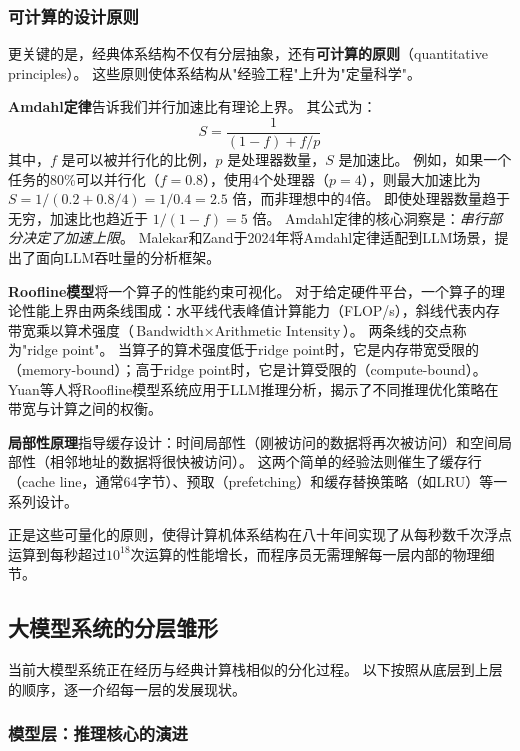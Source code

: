 \subsubsection{可计算的设计原则}

更关键的是，经典体系结构不仅有分层抽象，还有\textbf{可计算的原则}（quantitative principles）。
这些原则使体系结构从"经验工程"上升为"定量科学"。

\textbf{Amdahl定律}告诉我们并行加速比有理论上界。
其公式为：
\begin{equation}
\label{eq:amdahl}
S = \frac{1}{(1-f) + f/p}
\end{equation}
其中，$f$ 是可以被并行化的比例，$p$ 是处理器数量，$S$ 是加速比。
例如，如果一个任务的80\%可以并行化（$f=0.8$），使用4个处理器（$p=4$），则最大加速比为 $S = 1/(0.2 + 0.8/4) = 1/0.4 = 2.5$ 倍，而非理想中的4倍。
即使处理器数量趋于无穷，加速比也趋近于 $1/(1-f) = 5$ 倍。
Amdahl定律的核心洞察是：\emph{串行部分决定了加速上限}。
Malekar和Zand于2024年将Amdahl定律适配到LLM场景，提出了面向LLM吞吐量的分析框架\cite{malekar2024amdahlllm}。

\textbf{Roofline模型}将一个算子的性能约束可视化\cite{hennessy2017quantitative}。
对于给定硬件平台，一个算子的理论性能上界由两条线围成：水平线代表峰值计算能力（FLOP/s），斜线代表内存带宽乘以算术强度（$\text{Bandwidth} \times \text{Arithmetic Intensity}$）。
两条线的交点称为"ridge point"。
当算子的算术强度低于ridge point时，它是内存带宽受限的（memory-bound）；高于ridge point时，它是计算受限的（compute-bound）。
Yuan等人将Roofline模型系统应用于LLM推理分析，揭示了不同推理优化策略在带宽与计算之间的权衡\cite{yuan2024llminference}。

\textbf{局部性原理}指导缓存设计：时间局部性（刚被访问的数据将再次被访问）和空间局部性（相邻地址的数据将很快被访问）\cite{drepper2007memory}。
这两个简单的经验法则催生了缓存行（cache line，通常64字节）、预取（prefetching）和缓存替换策略（如LRU）等一系列设计。

正是这些可量化的原则，使得计算机体系结构在八十年间实现了从每秒数千次浮点运算到每秒超过$10^{18}$次运算的性能增长，而程序员无需理解每一层内部的物理细节。

\subsection{大模型系统的分层雏形}

当前大模型系统正在经历与经典计算栈相似的分化过程。
以下按照从底层到上层的顺序，逐一介绍每一层的发展现状。

\subsubsection{模型层：推理核心的演进}

